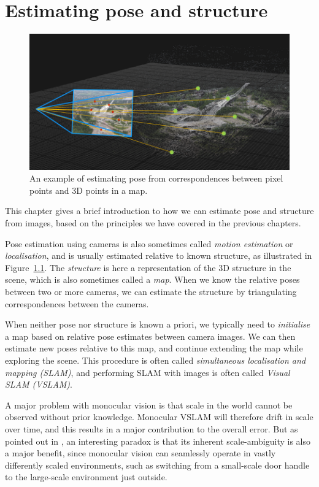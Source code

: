\chapter{Estimating pose and structure} \label{ch:estimating-pose-and-structure}
\begin{figure}[htb]
    \centering
    \includegraphics[width=\columnwidth]{figures/moba.png}
    \caption{An example of estimating pose from correspondences between pixel points and 3D points in a map.
    }
    \label{fig:moba}
\end{figure}

This chapter gives a brief introduction to how we can estimate pose and structure from images, based on the principles we have covered in the previous chapters.

Pose estimation using cameras is also sometimes called \emph{motion estimation} or \emph{localisation}, and is usually estimated relative to known structure, as illustrated in Figure~\ref{fig:moba}.
The \emph{structure} is here a representation of the 3D structure in the scene, which is also sometimes called a \emph{map}.
When we know the relative poses between two or more cameras, we can estimate the structure by triangulating correspondences between the cameras.

When neither pose nor structure is known a priori, we typically need to \emph{initialise} a map based on relative pose estimates between camera images.
We can then estimate new poses relative to this map, and continue extending the map while exploring the scene.
This procedure is often called \emph{simultaneous localisation and mapping (SLAM)}, and performing SLAM with images is often called \emph{Visual SLAM (VSLAM)}.

A major problem with monocular vision is that scale in the world cannot be observed without prior knowledge. 
Monocular VSLAM will therefore drift in scale over time, and this results in a major contribution to the overall error. 
But as pointed out in \cite{Engel2014LSD-SLAM:SLAM}, an interesting paradox is that its inherent scale-ambiguity is also a major benefit, since monocular vision can seamlessly operate in vastly differently scaled environments, such as switching from a small-scale door handle to the large-scale environment just outside.

